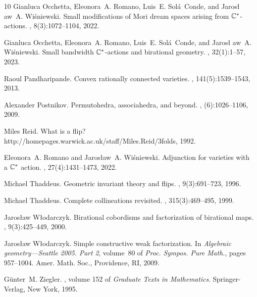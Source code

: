 \begin{thebibliography}{10}
Gianluca Occhetta, Eleonora~A. Romano, Luis~E. Sol\'{a}~Conde, and Jaros\l
  aw~A. Wi\'{s}niewski.
\newblock Small modifications of {M}ori dream spaces arising from
  {$\Bbb{C}^*$}-actions.
, 8(3):1072--1104, 2022.

Gianluca Occhetta, Eleonora~A. Romano, Luis~E. Sol\'{a}~Conde, and Jaros\l
  aw~A. Wi\'{s}niewski.
\newblock Small bandwidth {$\Bbb C^*$}-actions and birational geometry.
, 32(1):1--57, 2023.

Raoul Pandharipande.
\newblock Convex rationally connected varieties.
, 141(5):1539--1543, 2013.

Alexander Postnikov.
\newblock Permutohedra, associahedra, and beyond.
, (6):1026--1106, 2009.

Miles Reid.
\newblock What is a flip? %
  {http://homepages.warwick.ac.uk/staff/Miles.Reid/3folds}, 1992.

Eleonora~A. Romano and Jaros\l aw~A. Wi\'{s}niewski.
\newblock Adjunction for varieties with a {$\Bbb{C}^*$} action.
, 27(4):1431--1473, 2022.

Michael Thaddeus.
\newblock Geometric invariant theory and flips.
, 9(3):691--723, 1996.

Michael Thaddeus.
\newblock Complete collineations revisited.
, 315(3):469--495, 1999.

Jaros{\l}aw W{\l}odarczyk.
\newblock Birational cobordisms and factorization of birational maps.
, 9(3):425--449, 2000.

Jaros{\l}aw W{\l}odarczyk.
\newblock Simple constructive weak factorization.
\newblock In {\em Algebraic geometry---{S}eattle 2005. {P}art 2}, volume~80 of
  {\em Proc. Sympos. Pure Math.}, pages 957--1004. Amer. Math. Soc.,
  Providence, RI, 2009.

G\"{u}nter~M. Ziegler.
, volume 152 of {\em Graduate Texts in
  Mathematics}.
\newblock Springer-Verlag, New York, 1995.

\end{thebibliography}
